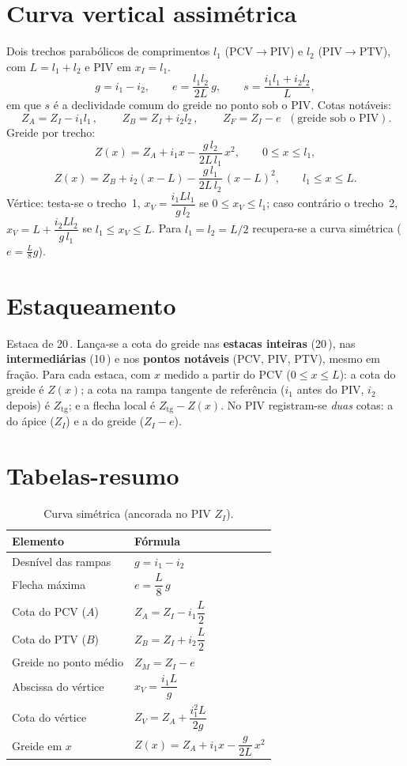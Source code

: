 \documentclass[11pt,a4paper]{article}
\newcommand{\m}{\,\text{m}}
\begin{document}
\section{Curva vertical assimétrica}

Dois trechos parabólicos de comprimentos $l_1$ (PCV$\to$PIV) e $l_2$
(PIV$\to$PTV), com $L=l_1+l_2$ e PIV em $x_I=l_1$.
\[
g = i_1 - i_2, \qquad e = \frac{l_1 l_2}{2L}\,g, \qquad
s = \frac{i_1 l_1 + i_2 l_2}{L},
\]
em que $s$ é a declividade comum do greide no ponto sob o PIV. Cotas notáveis:
\[
\boxed{\,Z_A = Z_I - i_1 l_1\,}, \qquad
\boxed{\,Z_B = Z_I + i_2 l_2\,}, \qquad
\boxed{\,Z_F = Z_I - e\,}\ \ (\text{greide sob o PIV}).
\]
Greide por trecho:
\[
Z(x) = Z_A + i_1 x - \frac{g\,l_2}{2L\,l_1}\,x^2, \qquad 0 \le x \le l_1,
\]
\[
Z(x) = Z_B + i_2 (x-L) - \frac{g\,l_1}{2L\,l_2}\,(x-L)^2, \qquad l_1 \le x \le L.
\]
Vértice: testa-se o trecho~1, $x_V = \dfrac{i_1 L l_1}{g\,l_2}$ se $0\le x_V\le l_1$;
caso contrário o trecho~2, $x_V = L + \dfrac{i_2 L l_2}{g\,l_1}$ se $l_1\le x_V\le L$.
Para $l_1=l_2=L/2$ recupera-se a curva simétrica ($e=\tfrac{L}{8}g$).

\section{Estaqueamento}

Estaca de 20\m. Lança-se a cota do greide nas \textbf{estacas inteiras} (20\m),
nas \textbf{intermediárias} (10\m) e nos \textbf{pontos notáveis} (PCV, PIV, PTV),
mesmo em fração. Para cada estaca, com $x$ medido a partir do PCV ($0\le x\le L$):
a cota do greide é $Z(x)$; a cota na rampa tangente de referência ($i_1$ antes do
PIV, $i_2$ depois) é $Z_{\mathrm{tg}}$; e a flecha local é $Z_{\mathrm{tg}}-Z(x)$.
No PIV registram-se \emph{duas} cotas: a do ápice ($Z_I$) e a do greide ($Z_I-e$).

\section{Tabelas-resumo}

\begin{table}[h]
\centering
\caption{Curva simétrica (ancorada no PIV $Z_I$).}
\begin{tabular}{ll}
\toprule
Elemento & Fórmula \\
\midrule
Desnível das rampas & $g = i_1 - i_2$ \\
Flecha máxima & $e = \dfrac{L}{8}\,g$ \\
Cota do PCV ($A$) & $Z_A = Z_I - i_1\dfrac{L}{2}$ \\
Cota do PTV ($B$) & $Z_B = Z_I + i_2\dfrac{L}{2}$ \\
Greide no ponto médio & $Z_M = Z_I - e$ \\
Abscissa do vértice & $x_V = \dfrac{i_1 L}{g}$ \\
Cota do vértice & $Z_V = Z_A + \dfrac{i_1^2 L}{2g}$ \\
Greide em $x$ & $Z(x) = Z_A + i_1 x - \dfrac{g}{2L}\,x^2$ \\
\bottomrule
\end{tabular}
\end{table}
\end{document}
